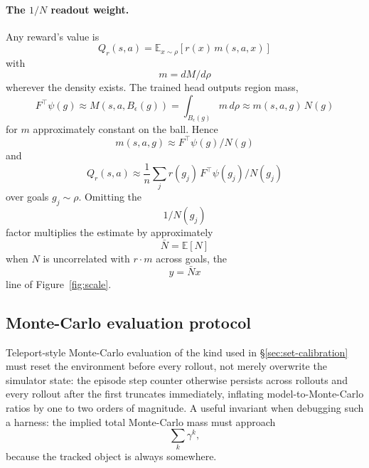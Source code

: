 \documentclass{article}
\newcommand{\E}{\mathbb{E}}
\begin{document}
\paragraph{The $1/N$ readout weight.}
Any reward's value is
\begin{equation}
Q_{r}(s,a)=\E_{x\sim\rho}[r(x)\,m(s,a,x)]
\end{equation}
with
\begin{equation}
m=dM/d\rho
\end{equation}
wherever the density exists.
The trained head outputs region mass,
\begin{equation*}
F^{\top}\psi(g)\approx M(s,a,B_\epsilon(g))=\int_{B_\epsilon(g)}m\,d\rho \approx m(s,a,g)\,N(g)
\end{equation*}
for $m$ approximately constant on the ball.
Hence
\begin{equation}
m(s,a,g)\approx F^{\top}\psi(g)/N(g)
\end{equation}
and
\begin{equation*}
Q_{r}(s,a)\approx\frac{1}{n}\sum_{j}r(g_{j})\,F^{\top}\psi(g_{j})/N(g_{j})
\end{equation*}
over goals $g_{j}\sim\rho$.
Omitting the
\begin{equation}
1/N(g_{j})
\end{equation}
factor multiplies the estimate by approximately
\begin{equation}
\bar N=\E[N]
\end{equation}
when $N$ is uncorrelated with $r\cdot m$ across goals, the
\begin{equation}
y=\bar N x
\end{equation}
line of Figure~\ref{fig:scale}.

\subsection{Monte-Carlo evaluation protocol}
\label{app:mc}

Teleport-style Monte-Carlo evaluation of the kind used in \S\ref{sec:set-calibration} must reset the environment before every rollout, not merely overwrite the simulator state: the episode step counter otherwise persists across rollouts and every rollout after the first truncates immediately, inflating model-to-Monte-Carlo ratios by one to two orders of magnitude.
A useful invariant when debugging such a harness: the implied total Monte-Carlo mass must approach
\begin{equation}
\sum_k\gamma^k,
\end{equation}
because the tracked object is always somewhere.
\end{document}
